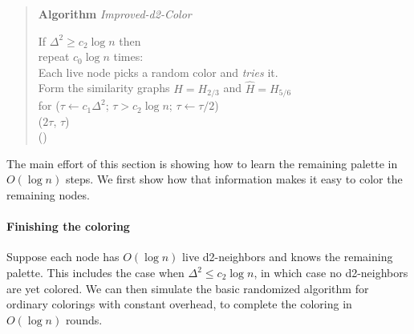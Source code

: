 \begin{quote}
   \textbf{Algorithm} \emph{Improved-d2-Color}

   If $\Delta^2 \ge c_2\log n$ then  \\
   \hspace*{2em} repeat $c_0 \log n$ times: \\
   \hspace*{4em} Each live node picks a random color and \emph{tries} it. \\     
   \hspace*{2em} Form the similarity graphs $H=H_{2/3}$ and $\hat{H} = H_{5/6}$ \\
   \hspace*{2em} for ($\tau \leftarrow c_1 \Delta^2$; $\tau > c_2\log n$; $\tau \leftarrow \tau/2$) \\
   \hspace*{4em}      ($2 \tau$, $\tau$) \\
    () \\
\end{quote}

The main effort of this section is showing how to learn the remaining palette in $O(\log n)$ steps.
We first show how that information makes it easy to color the remaining nodes.

\paragraph{Finishing the coloring}

Suppose each node has $O(\log n)$ live d2-neighbors and knows the remaining palette. This includes the case when $\Delta^2 \le c_2\log n$, in which case no d2-neighbors are yet colored. 
We can then simulate the basic randomized algorithm for ordinary colorings with constant overhead, to complete the coloring in $O(\log n)$ rounds.

